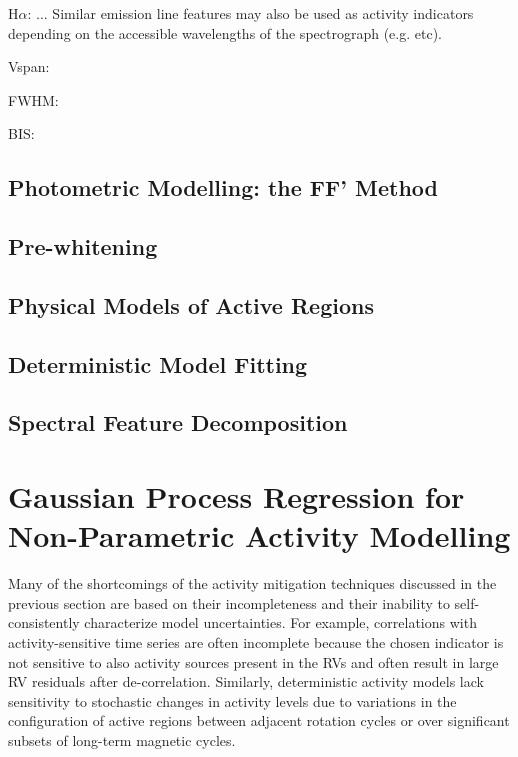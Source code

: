 H$\alpha$: ...
Similar emission line features may also be used as activity indicators depending
on the accessible wavelengths of the spectrograph (e.g. \hei{,} \nai{,} etc).

Vspan:
\citep{queloz01}

FWHM:

BIS:


\citep{boisse09,boisse11}

\subsection{Photometric Modelling: the FF' Method }
\citep{aigrain12}

\subsection{Pre-whitening}
\citep{queloz09}

\subsection{Physical Models of Active Regions}
\citep{dumusque14}

\subsection{Deterministic Model Fitting}
\citep{sarkis18}

\subsection{Spectral Feature Decomposition}
\citep{davis17}


\section{Gaussian Process Regression for Non-Parametric Activity Modelling} \label{sect:gp}
Many of the shortcomings of the activity mitigation techniques discussed in the
previous section are based on their incompleteness and their inability to
self-consistently characterize model uncertainties. For example, correlations with
activity-sensitive time series are often incomplete because the chosen indicator
is not sensitive to also activity sources present in the RVs and often result in
large RV residuals after de-correlation. Similarly, deterministic activity models
lack sensitivity to stochastic changes in activity levels due to variations in
the configuration of active regions between adjacent rotation cycles or over
significant subsets of long-term magnetic cycles. \\

